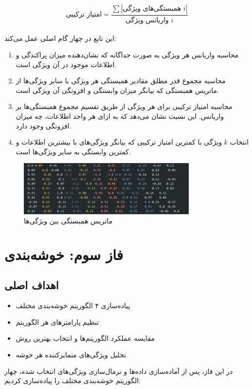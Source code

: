 \documentclass[a4paper,12pt]{article}
\let\nobreaksection\section
\renewcommand{\section}{\nobreaksection}
\begin{document}
\begin{equation}
\text{امتیاز ترکیبی} = \frac{\sum|\text{همبستگی‌های ویژگی }i|}{\text{واریانس ویژگی }i}
\end{equation}
\\
این تابع در چهار گام اصلی عمل می‌کند:

\begin{enumerate}
\item محاسبه واریانس هر ویژگی به صورت جداگانه که نشان‌دهنده میزان پراکندگی و اطلاعات موجود در آن ویژگی است.

\item محاسبه مجموع قدر مطلق مقادیر همبستگی هر ویژگی با سایر ویژگی‌ها از ماتریس همبستگی که بیانگر میزان وابستگی و افزونگی آن ویژگی است.

\item محاسبه امتیاز ترکیبی برای هر ویژگی از طریق تقسیم مجموع همبستگی‌ها بر واریانس. این نسبت نشان می‌دهد که به ازای هر واحد اطلاعات، چه میزان افزونگی وجود دارد.

\item انتخاب $k$ ویژگی با کمترین امتیاز ترکیبی که بیانگر ویژگی‌های با بیشترین اطلاعات و کمترین وابستگی به سایر ویژگی‌ها است.
\end{enumerate}

\begin{figure}[h]
\centering
\includegraphics[width=0.8\textwidth]{correlation_matrix.png}
\caption{ماتریس همبستگی بین ویژگی‌ها}
\end{figure}


\section{فاز سوم: خوشه‌بندی}

\subsection*{\textbf{اهداف اصلی}}
\begin{itemize}
	\item پیاده‌سازی ۴ الگوریتم خوشه‌بندی مختلف
	\item تنظیم پارامترهای هر الگوریتم
	\item مقایسه عملکرد الگوریتم‌ها و انتخاب بهترین روش
	\item تحلیل ویژگی‌های متمایزکننده هر خوشه
\end{itemize}
در این فاز، پس از آماده‌سازی داده‌ها و نرمال‌سازی ویژگی‌های انتخاب شده، چهار الگوریتم خوشه‌بندی مختلف را پیاده‌سازی کردیم:
\end{document}
